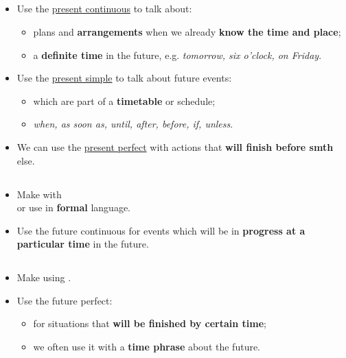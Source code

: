 \subsection{}
\begin{itemize}
    \item Use the \underline{present continuous} to talk about:
    \begin{itemize}
        \item plans and \textbf{arrangements} when we already \textbf{know the time and place};
        \item a \textbf{definite time} in the future, e.g. \textit{tomorrow, six o'clock, on Friday}.
    \end{itemize}
    \item[\doot] Use the \underline{present simple} to talk about future events:
    \begin{itemize}
        \item[\daash] which are part of a \textbf{timetable} or schedule;
        \item[\daash]  \textit{when, as soon as, until, after, before, if, unless}.
    \end{itemize}
    \item[\doot] We can use the \underline{present perfect} with actions that \textbf{will finish before smth} else.
\end{itemize}

\subsection{}
\begin{itemize}
    \item[\doot] Make with \\
    or use  in \textbf{formal} language.
    \item[\doot] Use the future continuous for events which will be in \textbf{progress at a particular time} in the future.
\end{itemize}

\subsection{}
\begin{itemize}
    \item[\doot] Make using .
    \item[\doot] Use the future perfect:
    \begin{itemize}
        \item[\daash] for situations that \textbf{will be finished by certain time};
        \item[\daash] we often use it with a \textbf{time phrase} about the future.
    \end{itemize}
\end{itemize}

